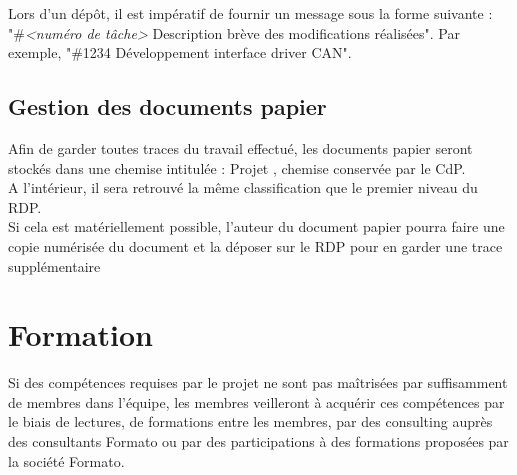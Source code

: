 \documentclass[a4paper,11pt,titlepage]{article}
\begin{document}
Lors d'un dépôt, il est impératif de fournir un message sous la forme suivante : 
"\#\emph{<numéro de tâche>} Description brève des modifications réalisées". 
Par exemple, "\#1234 Développement interface driver CAN".\\

\subsection{Gestion des documents papier}
Afin de garder toutes traces du travail effectué, les documents
papier seront stockés dans une chemise intitulée : Projet \projectName, chemise
conservée par le CdP.\\

A l'intérieur, il sera retrouvé la même classification que le
premier niveau du RDP. \\

Si cela est matériellement possible, l'auteur du document papier
pourra faire une copie numérisée du document et la déposer sur
le RDP pour en garder une trace supplémentaire\\

\section{Formation}
Si des compétences requises par le projet ne sont pas maîtrisées
par suffisamment de membres dans l'équipe, les membres veilleront
à acquérir ces compétences par le biais de lectures, de formations
entre les membres, par des consulting auprès des consultants
Formato ou par des participations à des formations proposées
par la société Formato.\\

\newpage
\end{document}
